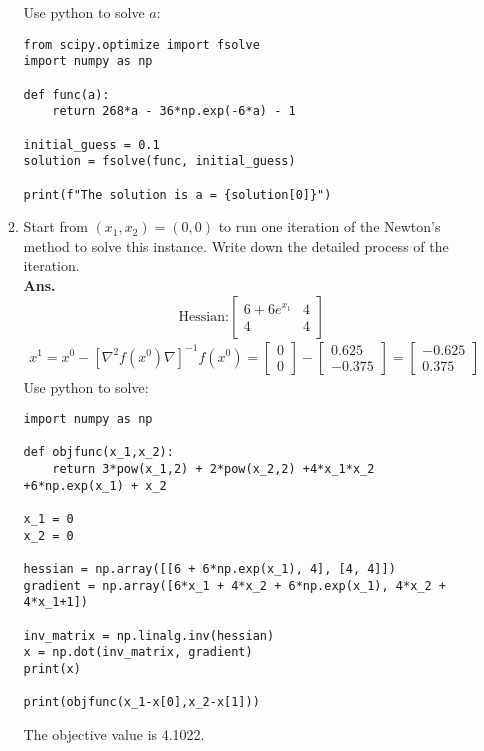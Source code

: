 \documentclass[12pt]{article}
\begin{document}
\begin{enumerate}
\begin{enumerate}
\begin{itemize}
                        \end{itemize}
                        Use python to solve $a$:
                        \begin{lstlisting}
from scipy.optimize import fsolve
import numpy as np

def func(a):
    return 268*a - 36*np.exp(-6*a) - 1

initial_guess = 0.1
solution = fsolve(func, initial_guess)

print(f"The solution is a = {solution[0]}")
                        \end{lstlisting}
                  \item Start from $(x_1, x_2) = (0, 0)$ to run one iteration of the Newton's method to solve this instance. Write down the detailed process of the iteration.\\
                  \textbf{Ans.}
                  \begin{equation*}
                        \text{Hessian:} 
                        \begin{bmatrix}
                              6+6e^{x_1} & 4\\
                              4 & 4
                        \end{bmatrix}
                  \end{equation*}
                  \begin{align*}
                        x^1 = x^0 - [\nabla^{2}f(x^0)\nabla]^{-1} f(x^0) = \begin{bmatrix}
                              0\\
                              0
                        \end{bmatrix} - \begin{bmatrix}
                              0.625\\
                              -0.375
                        \end{bmatrix} = \begin{bmatrix}
                              -0.625\\
                              0.375
                        \end{bmatrix}
                  \end{align*}
                  Use python to solve:
                  \begin{lstlisting}
import numpy as np

def objfunc(x_1,x_2):
    return 3*pow(x_1,2) + 2*pow(x_2,2) +4*x_1*x_2 +6*np.exp(x_1) + x_2

x_1 = 0
x_2 = 0

hessian = np.array([[6 + 6*np.exp(x_1), 4], [4, 4]])
gradient = np.array([6*x_1 + 4*x_2 + 6*np.exp(x_1), 4*x_2 + 4*x_1+1])

inv_matrix = np.linalg.inv(hessian)
x = np.dot(inv_matrix, gradient)
print(x)

print(objfunc(x_1-x[0],x_2-x[1]))
                  \end{lstlisting}
                  The objective value is 4.1022.
            \end{enumerate}
\end{enumerate}
\end{document}

